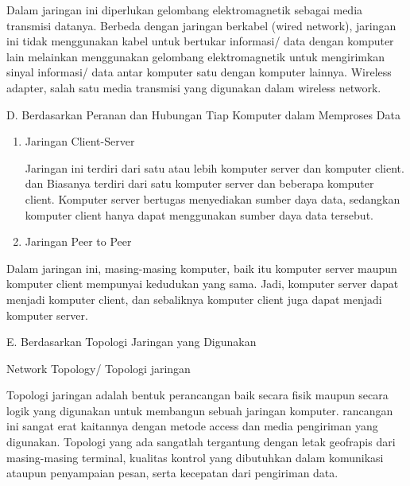  \par
Dalam jaringan ini diperlukan gelombang elektromagnetik sebagai media transmisi datanya. Berbeda dengan jaringan berkabel (wired network), jaringan ini tidak menggunakan kabel untuk bertukar informasi/ data dengan komputer lain melainkan menggunakan gelombang elektromagnetik untuk mengirimkan sinyal informasi/ data antar komputer satu dengan komputer lainnya. Wireless adapter, salah satu media transmisi yang digunakan dalam wireless network. \par
\vspace{12pt}
\noindent 
D. Berdasarkan Peranan dan Hubungan Tiap Komputer dalam Memproses Data \par
\vspace{12pt}
\noindent 
\begin{enumerate}
\item Jaringan Client-Server \par
Jaringan ini terdiri dari satu atau lebih komputer server dan komputer client. dan Biasanya terdiri dari satu komputer server dan beberapa komputer client. Komputer server bertugas menyediakan sumber daya data, sedangkan komputer client hanya dapat menggunakan sumber daya data tersebut. \par
\vspace{12pt}
\noindent 
\item Jaringan Peer to Peer\end{enumerate}
 \par
Dalam jaringan ini, masing-masing komputer, baik itu komputer server maupun komputer client mempunyai kedudukan yang sama. Jadi, komputer server dapat menjadi komputer client, dan sebaliknya komputer client juga dapat menjadi komputer server. \par
\vspace{12pt}
\noindent 
E. Berdasarkan Topologi Jaringan yang Digunakan \par
\noindent 
Network Topology/ Topologi jaringan \par
\vspace{12pt}
Topologi jaringan adalah bentuk perancangan baik secara fisik maupun secara logik yang digunakan untuk membangun sebuah jaringan komputer. rancangan ini sangat erat kaitannya dengan metode access dan media pengiriman yang digunakan. Topologi yang ada sangatlah tergantung dengan letak geofrapis dari masing-masing terminal, kualitas kontrol yang dibutuhkan dalam komunikasi ataupun penyampaian pesan, serta kecepatan dari pengiriman data. \par
\noindent 
